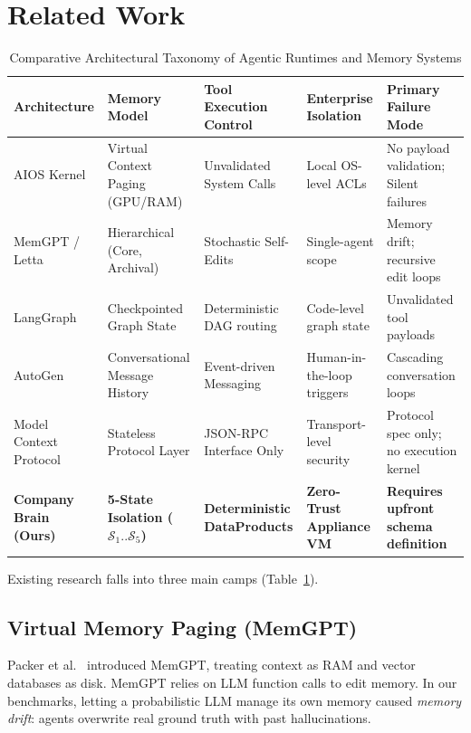 \documentclass[10pt,journal,compsoc]{IEEEtran}
\begin{document}
\section{Related Work}
\label{sec:related}

\begin{table}[t]
\caption{Comparative Architectural Taxonomy of Agentic Runtimes and Memory Systems}
\label{tab:comparison}
\centering
\begin{tabular}{lllll}
\toprule
\textbf{Architecture} & \textbf{Memory Model} & \textbf{Tool Execution Control} & \textbf{Enterprise Isolation} & \textbf{Primary Failure Mode} \\
\midrule
AIOS Kernel~\cite{mei2024aios} & Virtual Context Paging (GPU/RAM) & Unvalidated System Calls & Local OS-level ACLs & No payload validation; Silent failures \\
MemGPT / Letta~\cite{packer2023memgpt} & Hierarchical (Core, Archival) & Stochastic Self-Edits & Single-agent scope & Memory drift; recursive edit loops \\
LangGraph~\cite{langchain2024langgraph} & Checkpointed Graph State & Deterministic DAG routing & Code-level graph state & Unvalidated tool payloads \\
AutoGen~\cite{autogen2024microsoft} & Conversational Message History & Event-driven Messaging & Human-in-the-loop triggers & Cascading conversation loops \\
Model Context Protocol~\cite{anthropic2024mcp} & Stateless Protocol Layer & JSON-RPC Interface Only & Transport-level security & Protocol spec only; no execution kernel \\
\textbf{Company Brain (Ours)} & \textbf{5-State Isolation ($\mathcal{S}_1..\mathcal{S}_5$)} & \textbf{Deterministic DataProducts} & \textbf{Zero-Trust Appliance VM} & \textbf{Requires upfront schema definition} \\
\bottomrule
\end{tabular}
\end{table}

Existing research falls into three main camps (Table~\ref{tab:comparison}).

\subsection{Virtual Memory Paging (MemGPT)}
Packer et al.~\cite{packer2023memgpt} introduced MemGPT, treating context as RAM and vector databases as disk. MemGPT relies on LLM function calls to edit memory. In our benchmarks, letting a probabilistic LLM manage its own memory caused \emph{memory drift}: agents overwrite real ground truth with past hallucinations.
\end{document}
